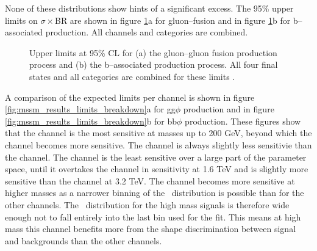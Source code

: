 None of these distributions show hints of a significant excess. The
95\% upper limits on $\sigma\times$BR are shown in figure \ref{fig:mssm_results_limits}a
for gluon--fusion and in figure \ref{fig:mssm_results_limits}b for b--associated
production. All channels and categories are combined. 
\begin{figure}[h!]
\begin{center}
\end{center}
\caption{Upper limits at 95\% CL for (a) the gluon--gluon fusion production
process and (b) the b--associated production process. All four final states and 
all categories are combined for these limits \cite{CMS-PAS-HIG-16-037}.}
\label{fig:mssm_results_limits}
\end{figure}

A comparison of the expected limits
per channel is shown in figure \ref{fig:mssm_results_limits_breakdown}a for gg$\phi$ production
and in figure \ref{fig:mssm_results_limits_breakdown}b for bb$\phi$ production.
These figures show that the \mutau channel is the most sensitive at masses up to 
200 GeV, beyond which the \tautau channel becomes more sensitive. The \etau
channel is always slightly less sensitivie than the \mutau channel. The \emu channel
is the least sensitive over a large part of the parameter space, until it overtakes the 
\etau channel in sensitivity at 1.6 TeV and is slightly more sensitive than the
\mutau channel at 3.2 TeV. The \emu channel becomes more sensitive at higher masses as
a narrower binning of the \mTtot~distribution is possible than for the other channels.
The \mTtot~distribution for the high mass signals is therefore wide enough not to
fall entirely into the last bin used for the fit. This means at high mass this channel
benefits more from the shape discrimination between signal and backgrounds than
the other channels.


